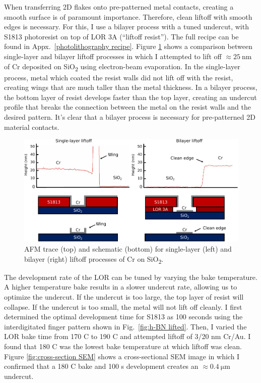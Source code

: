 \documentclass{beavtex_dub_edit}
\begin{document}
When transferring 2D flakes onto pre-patterned metal contacts, creating a smooth surface is of paramount importance. Therefore, clean liftoff with smooth edges is necessary. For this, I use a bilayer process with a tuned undercut, with S1813 photoresist on top of LOR 3A (“liftoff resist”). The full recipe can be found in Appx.\ \ref{photolithography recipe}. Figure \ref{fig:Liftoff AFM} shows a comparison between single-layer and bilayer liftoff processes in which I attempted to lift off $\approx \SI{25}{\nano\meter}$ of Cr deposited on SiO\textsubscript{2} using electron-beam evaporation. In the single-layer process, metal which coated the resist walls did not lift off with the resist, creating wings that are much taller than the metal thickness. In a bilayer process, the bottom layer of resist develops faster than the top layer, creating an undercut profile that breaks the connection between the metal on the resist walls and the desired pattern. It’s clear that a bilayer process is necessary for pre-patterned 2D material contacts. 




\begin{figure}
    \includegraphics[width = 1\textwidth]{liftoff AFM traces comparison.pdf}
    \caption{AFM trace (top) and schematic (bottom) for single-layer (left) and bilayer (right) liftoff processes of Cr on SiO\textsubscript{2}.}
    \label{fig:Liftoff AFM}
\end{figure}

The development rate of the LOR can be tuned by varying the bake temperature. A higher temperature bake results in a slower undercut rate, allowing us to optimize the undercut. If the undercut is too large, the top layer of resist will collapse. If the undercut is too small, the metal will not lift off cleanly. I first determined the optimal development time for S1813 as 100 seconds using the interdigitated finger pattern shown in Fig.\ \ref{fig:h-BN lifted}. Then, I varied the LOR bake time from 170 C to 190 C and attempted liftoff of 3/20 nm Cr/Au. I found that 180 C was the lowest bake temperature at which liftoff was clean. Figure \ref{fig:cross-section SEM} shows a cross-sectional SEM image in which I confirmed that a 180 C bake and 100 s development creates an $\approx \SI{0.4}{\micro\meter}$ undercut.
\end{document}
